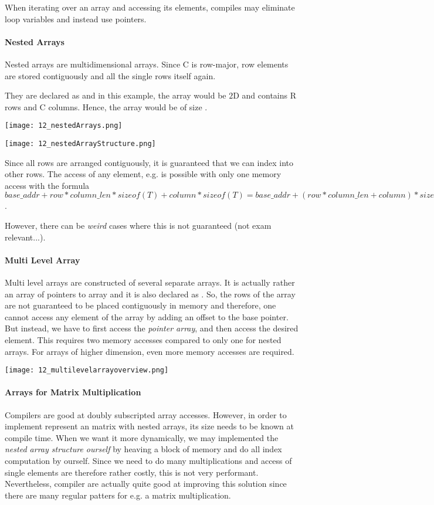When iterating over an array and accessing its elements, compiles may eliminate loop variables and instead use pointers.

\paragraph{Nested Arrays}
Nested arrays are multidimensional arrays. Since C is row-major, row elements are stored contiguously and all the single rows itself again.

They are declared as  and in this example, the array would be $2$D and contains R rows and C columns. Hence, the array would be of size .

\texttt{[image: 12\_nestedArrays.png]}

\texttt{[image: 12\_nestedArrayStructure.png]}

Since all rows are arranged contiguously, it is guaranteed that we can index into other rows. The access of any element, e.g.  is possible with only one memory access with the formula $base\_addr + row * column\_len * sizeof(T) + column * sizeof(T) = base\_addr + (row * column\_len + column) * sizeof(T)$.

However, there can be \textit{weird} cases where this is not guaranteed (not exam relevant...).

\paragraph{Multi Level Array}
Multi level arrays are constructed of several separate arrays. It is actually rather an array of pointers to array and it is also declared as . So, the rows of the array are not guaranteed to be placed contiguously in memory and therefore, one cannot access any element of the array by adding an offset to the base pointer. But instead, we have to first access the \textit{pointer array}, and then access the desired element. This requires two memory accesses compared to only one for nested arrays. For arrays of higher dimension, even more memory accesses are required.

\texttt{[image: 12\_multilevelarrayoverview.png]}

\paragraph{Arrays for Matrix Multiplication}
Compilers are good at doubly subscripted array accesses. However, in order to implement represent an matrix with nested arrays, its size needs to be known at compile time. When we want it more dynamically, we may implemented the \textit{nested array structure ourself} by heaving a block of memory and do all index computation by ourself. Since we need to do many multiplications and access of single elements are therefore rather costly, this is not very performant. Nevertheless, compiler are actually quite good at improving this solution since there are many regular patters for e.g. a matrix multiplication.

